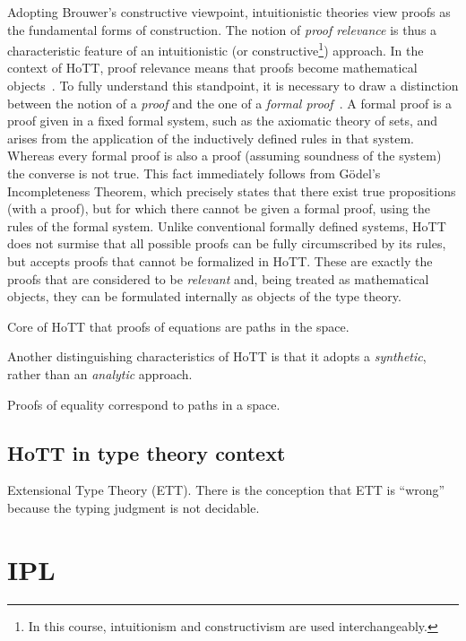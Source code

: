 \documentclass[12pt]{article}
\begin{document}
Adopting Brouwer's constructive viewpoint, intuitionistic theories view proofs as the
fundamental forms of construction.  The notion of \emph{proof relevance} is thus a
characteristic feature of an intuitionistic (or constructive\footnote{In this course,
  intuitionism and constructivism are used interchangeably.}) approach.  In the context of
\ac{HoTT}, proof relevance means that proofs become mathematical objects~\cite{Harper2013}.  To
fully understand this standpoint, it is necessary to draw a distinction between the notion of a
\emph{proof} and the one of a \emph{formal proof}~\cite{Harper2013,Harper2012}.  A formal proof
is a proof given in a fixed formal system, such as the axiomatic theory of sets, and arises
from the application of the inductively defined rules in that system.  Whereas every formal
proof is also a proof (assuming soundness of the system) the converse is not true.  This fact
immediately follows from G\"{o}del's Incompleteness Theorem, which precisely states that there
exist true propositions (with a proof), but for which there cannot be given a formal proof,
using the rules of the formal system.  Unlike conventional formally defined systems, \ac{HoTT}
does not surmise that all possible proofs can be fully circumscribed by its rules, but accepts
proofs that cannot be formalized in \ac{HoTT}.  These are exactly the proofs that are
considered to be \emph{relevant} and, being treated as mathematical objects, they can be
formulated internally as objects of the type theory.

Core of \ac{HoTT} that proofs of equations are paths in the space.

Another distinguishing characteristics of \acs{HoTT} is that it adopts a \emph{synthetic},
rather than an \emph{analytic} approach.  

Proofs of equality correspond to paths in a space.

\subsection{\Acs{HoTT} in type theory context}\label{subsec:type_theory_context}

Extensional Type Theory (ETT).  There is the conception that ETT is ``wrong''~\cite{Harper2012}
because the typing judgment is not decidable.

\section{\Acl{IPL}}\label{sec:ipl}
\end{document}
